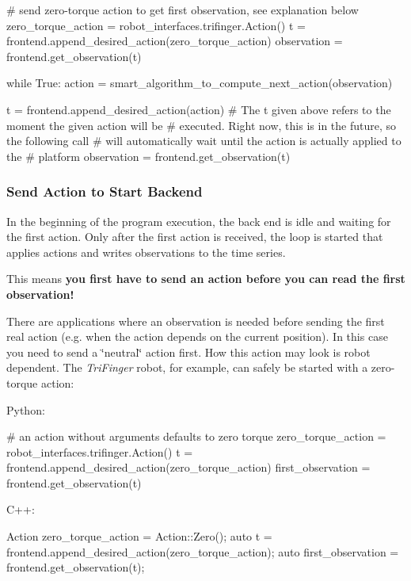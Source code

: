 \begin{DoxyCode}
\textcolor{comment}{# send zero-torque action to get first observation, see explanation below}
zero\_torque\_action = robot\_interfaces.trifinger.Action()
t = frontend.append\_desired\_action(zero\_torque\_action)
observation = frontend.get\_observation(t)

\textcolor{keywordflow}{while} \textcolor{keyword}{True}:
    action = smart\_algorithm\_to\_compute\_next\_action(observation)

    t = frontend.append\_desired\_action(action)
    \textcolor{comment}{# The t given above refers to the moment the given action will be}
    \textcolor{comment}{# executed.  Right now, this is in the future, so the following call}
    \textcolor{comment}{# will automatically wait until the action is actually applied to the}
    \textcolor{comment}{# platform}
    observation = frontend.get\_observation(t)
\end{DoxyCode}


\subsubsection*{Send Action to Start Backend}

In the beginning of the program execution, the back end is idle and waiting for the first action. Only after the first action is received, the loop is started that applies actions and writes observations to the time series.

This means {\bfseries you first have to send an action before you can read the first observation!}

There are applications where an observation is needed before sending the first real action (e.\+g. when the action depends on the current position). In this case you need to send a \char`\"{}neutral\char`\"{} action first. How this action may look is robot dependent. The {\itshape Tri\+Finger} robot, for example, can safely be started with a zero-\/torque action\+:

Python\+:


\begin{DoxyCode}
\textcolor{comment}{# an action without arguments defaults to zero torque}
zero\_torque\_action = robot\_interfaces.trifinger.Action()
t = frontend.append\_desired\_action(zero\_torque\_action)
first\_observation = frontend.get\_observation(t)
\end{DoxyCode}


C++\+:


\begin{DoxyCode}
Action zero\_torque\_action = Action::Zero();
\textcolor{keyword}{auto} t = frontend.append\_desired\_action(zero\_torque\_action);
\textcolor{keyword}{auto} first\_observation = frontend.get\_observation(t);
\end{DoxyCode}


